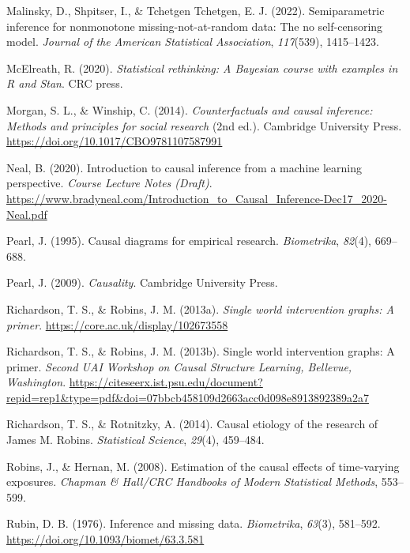\documentclass[
  single column]{article}
\newlength{\cslhangindent}
\newenvironment{CSLReferences}[2] %
 {\begin{list}{}{%
  \setlength{\itemindent}{0pt}
  \setlength{\leftmargin}{0pt}
  \setlength{\parsep}{0pt}
  \ifodd #1
   \setlength{\leftmargin}{\cslhangindent}
   \setlength{\itemindent}{-1\cslhangindent}
  \fi
  \setlength{\itemsep}{#2\baselineskip}}}
 {\end{list}}
\begin{document}
\begin{CSLReferences}{1}{0}
Malinsky, D., Shpitser, I., \& Tchetgen Tchetgen, E. J. (2022).
Semiparametric inference for nonmonotone missing-not-at-random data: The
no self-censoring model. \emph{Journal of the American Statistical
Association}, \emph{117}(539), 1415--1423.

McElreath, R. (2020). \emph{Statistical rethinking: A {B}ayesian course
with examples in {R} and {S}tan}. CRC press.

Morgan, S. L., \& Winship, C. (2014). \emph{Counterfactuals and causal
inference: Methods and principles for social research} (2nd ed.).
Cambridge University Press.
\url{https://doi.org/10.1017/CBO9781107587991}

Neal, B. (2020). Introduction to causal inference from a machine
learning perspective. \emph{Course Lecture Notes (Draft)}.
\url{https://www.bradyneal.com/Introduction_to_Causal_Inference-Dec17_2020-Neal.pdf}

Pearl, J. (1995). Causal diagrams for empirical research.
\emph{Biometrika}, \emph{82}(4), 669--688.

Pearl, J. (2009). \emph{Causality}. Cambridge University Press.

Richardson, T. S., \& Robins, J. M. (2013a). \emph{Single world
intervention graphs: A primer}.
\url{https://core.ac.uk/display/102673558}

Richardson, T. S., \& Robins, J. M. (2013b). Single world intervention
graphs: A primer. \emph{Second UAI Workshop on Causal Structure
Learning, {B}ellevue, {W}ashington}.
\url{https://citeseerx.ist.psu.edu/document?repid=rep1&type=pdf&doi=07bbcb458109d2663acc0d098e8913892389a2a7}

Richardson, T. S., \& Rotnitzky, A. (2014). Causal etiology of the
research of {J}ames {M}. {R}obins. \emph{Statistical Science},
\emph{29}(4), 459--484.

Robins, J., \& Hernan, M. (2008). Estimation of the causal effects of
time-varying exposures. \emph{Chapman \& Hall/CRC Handbooks of Modern
Statistical Methods}, 553--599.

Rubin, D. B. (1976). Inference and missing data. \emph{Biometrika},
\emph{63}(3), 581--592. \url{https://doi.org/10.1093/biomet/63.3.581}


\end{CSLReferences}
\end{document}
